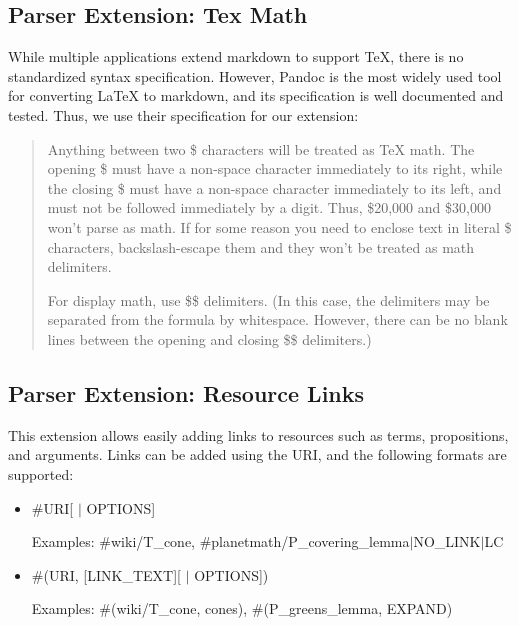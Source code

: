 \documentclass[a4paper]{article}
\begin{document}
\subsection{Parser Extension: Tex Math}

While multiple applications extend markdown to support TeX, there is no standardized syntax specification. However, Pandoc is the most widely used tool for converting LaTeX to markdown, and its specification is well documented and tested. Thus, we use their specification for our extension\cite{pandoc}:


\blockquote{Anything between two \$ characters will be treated as TeX math. The opening \$ must have a non-space character immediately to its right, while the closing \$ must have a non-space character immediately to its left, and must not be followed immediately by a digit. Thus, \$20,000 and \$30,000 won’t parse as math. If for some reason you need to enclose text in literal \$ characters, backslash-escape them and they won’t be treated as math delimiters.


For display math, use \$\$ delimiters. (In this case, the delimiters may be separated from the formula by whitespace. However, there can be no blank lines between the opening and closing \$\$ delimiters.)}


\subsection{Parser Extension: Resource Links}

This extension allows easily adding links to resources such as terms, propositions, and arguments. Links can be added using the URI, and the following formats are supported:


\begin{itemize}

	\item \#URI[ $\vert$ OPTIONS]


	Examples: \#wiki/T\_cone, \#planetmath/P\_covering\_lemma$\vert$NO\_LINK$\vert$LC

	\item \#(URI, [\textquotesingle LINK\_TEXT\textquotesingle][ $\vert$ OPTIONS])

	

	Examples: \#(wiki/T\_cone, \textquotesingle cones\textquotesingle), \#(P\_greens\_lemma, EXPAND)

\end{itemize}
\end{document}

